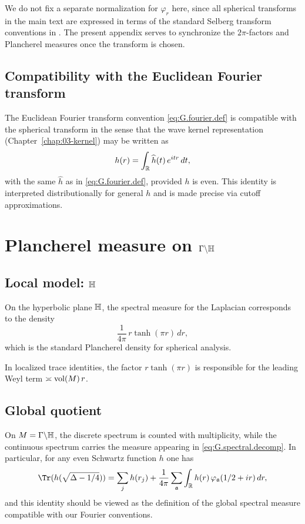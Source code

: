 We do not fix a separate normalization for $\varphi_r$ here, since all spherical transforms in the main text are
expressed in terms of the standard Selberg transform conventions in \cite{Hejhal1983,Iwaniec2002}.
The present appendix serves to synchronize the $2\pi$-factors and Plancherel measures once the transform is chosen.

\subsection{Compatibility with the Euclidean Fourier transform}
\label{subsec:G.compatibility}

The Euclidean Fourier transform convention \eqref{eq:G.fourier.def} is compatible with the spherical transform in the
sense that the wave kernel representation (Chapter~\ref{chap:03-kernel}) may be written as
\begin{equation}\label{eq:G.wave.repr}
h(r)
=
\int_{\mathbb{R}}\widehat{h}(t)\,e^{itr}\,dt,
\end{equation}
with the same $\widehat{h}$ as in \eqref{eq:G.fourier.def}, provided $h$ is even.
This identity is interpreted distributionally for general $h$ and is made precise via cutoff approximations.

\section{Plancherel measure on $\Gamma\backslash\mathbb{H}$}
\label{sec:G.plancherel.hyperbolic}

\subsection{Local model: $\mathbb{H}$}
\label{subsec:G.plancherel.H}

On the hyperbolic plane $\mathbb{H}$, the spectral measure for the Laplacian corresponds to the density
\[
\frac{1}{4\pi}\,r\tanh(\pi r)\,dr,
\]
which is the standard Plancherel density for spherical analysis.

In localized trace identities, the factor $r\tanh(\pi r)$ is responsible for the leading Weyl term
$\asymp \mathop{\mathrm{vol}}\nolimits(M)\,r$.

\subsection{Global quotient}
\label{subsec:G.plancherel.M}

On $M=\Gamma\backslash\mathbb{H}$, the discrete spectrum is counted with multiplicity, while the continuous spectrum carries
the measure appearing in \eqref{eq:G.spectral.decomp}.
In particular, for any even Schwartz function $h$ one has
\[
\Tr(h(\sqrt{\Delta-1/4}))
=
\sum_{j} h(r_j)
+
\frac{1}{4\pi}\sum_{\mathfrak{a}}
\int_{\R} h(r)\,\varphi_{\mathfrak{a}}(1/2+ir)\,dr,
\]
and this identity should be viewed as the definition of the global spectral measure compatible with our Fourier
conventions.


